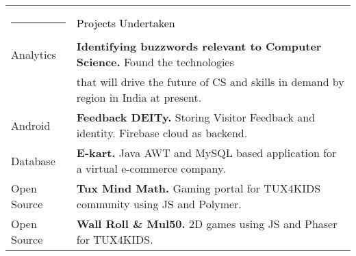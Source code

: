 \documentclass[12pt]{article}
\begin{document}
    \begin{tabular}{ll}{\hspace{10em}}\\
    	\textcolor{lightgray}{\rule{2.7cm}{4pt}} & \textcolor{black}{\LARGE{Projects Undertaken}}\\
    	\textmd{Analytics}&\textmd{\textbf{Identifying buzzwords relevant to Computer Science.} Found the technologies}\\
    	\textmd{}& \textmd{that will drive the future of CS and skills in demand by region in India at present.}\\
    	\textmd{Android}&\textmd{\textbf{Feedback DEITy.} Storing Visitor Feedback and identity. Firebase cloud as backend.}\\
    	\textmd{Database}&\textmd{\textbf{E-kart.} Java AWT and MySQL based application for a virtual e-commerce company.}\\
    	\textmd{Open Source}&\textmd{\textbf{Tux Mind Math.} Gaming portal for TUX4KIDS community using JS and Polymer.}\\
    	\textmd{Open Source}&\textmd{\textbf{Wall Roll \& Mul50.} 2D games using JS and Phaser for TUX4KIDS.}\\
    \end{tabular}
\end{document}
